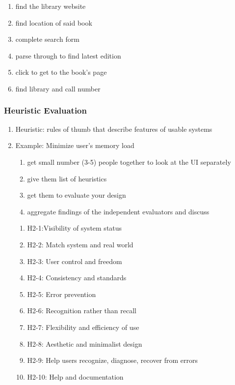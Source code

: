     \begin{enumerate}
        \item find the library website
        \item find location of said book
        \item complete search form
        \item parse through to find latest edition
        \item click to get to the book's page
        \item find library and call number
    \end{enumerate}

    \subsubsection{Heuristic Evaluation}
    \begin{enumerate}
        \item Heuristic: rules of thumb that describe features of usable systems
        \item Example: Minimize user's memory load
        \begin{enumerate}
            \item get small number (3-5) people together to look at the UI separately
            \item give them list of heuristics
            \item get them to evaluate your design 
            \item aggregate findings of the independent evaluators and discuss
        \end{enumerate}
        \begin{enumerate}
            \item H2-1:Visibility of system status 
            \item H2-2: Match system and real world
            \item H2-3: User control and freedom
            \item H2-4: Consistency and standards
            \item H2-5: Error prevention
            \item H2-6: Recognition rather than recall
            \item H2-7: Flexibility and efficiency of use
            \item H2-8: Aesthetic and minimalist design
            \item H2-9: Help users recognize, diagnose, recover from errors
            \item H2-10: Help and documentation
        \end{enumerate}
    \end{enumerate}

